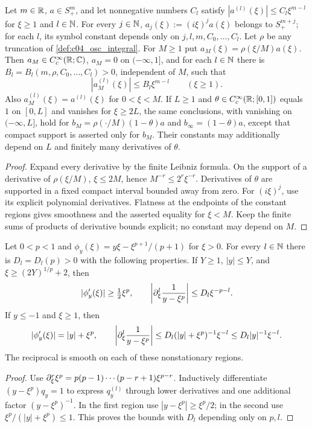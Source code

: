 \begin{lemma}
  \label{lem:c04_osc_cutoff_symbols}
  Let $m\in\mathbb{R}$, $a\in S^m_+$, and let nonnegative numbers $C_l$ satisfy
  $|a^{(l)}(\xi)|\le C_l\xi^{m-l}$ for $\xi\ge1$ and $l\in\mathbb{N}$.
  For every $j\in\mathbb{N}$, $a_j(\xi):=(i\xi)^ja(\xi)$ belongs to $S^{m+j}_+$;
  for each $l$, its symbol constant depends only on $j,l,m,C_0,\ldots,C_l$.
  Let $\rho$ be any truncation of \cref{def:c04_osc_integral}. For $M\ge1$ put
  $a_M(\xi)=\rho(\xi/M)a(\xi)$. Then $a_M\in C_c^\infty(\mathbb{R};\mathbb{C})$,
  $a_M=0$ on $(-\infty,1]$, and for each $l\in\mathbb{N}$ there is
  $B_l=B_l(m,\rho,C_0,\ldots,C_l)>0$, independent of $M$, such that
  \[
    |a_M^{(l)}(\xi)|\le B_l\xi^{m-l}\qquad(\xi\ge1).
  \]
  Also $a_M^{(l)}(\xi)=a^{(l)}(\xi)$ for $0<\xi<M$.
  If $L\ge1$ and $\theta\in C_c^\infty(\mathbb{R};[0,1])$ equals $1$ on $[0,L]$
  and vanishes for $\xi\ge2L$, the same conclusions, with vanishing on
  $(-\infty,L]$, hold for $b_M=\rho(\cdot/M)(1-\theta)a$ and
  $b_\infty=(1-\theta)a$, except that compact support is asserted only for $b_M$.
  Their constants may additionally depend on $L$ and finitely many derivatives of $\theta$.
\end{lemma}
\begin{proof}
  Expand every derivative by the finite Leibniz formula. On the support of a derivative
  of $\rho(\xi/M)$, $\xi\le2M$, hence $M^{-r}\le2^r\xi^{-r}$.
  Derivatives of $\theta$ are supported in a fixed compact interval bounded away from zero.
  For $(i\xi)^j$, use its explicit polynomial derivatives. Flatness at the endpoints of
  the constant regions gives smoothness and the asserted equality for $\xi<M$.
  Keep the finite sums of products of derivative bounds explicit; no constant may depend on $M$.
\end{proof}

\begin{lemma}
  \label{lem:c04_osc_phase_reciprocal}
  Let $0<p<1$ and $\phi_y(\xi)=y\xi-\xi^{p+1}/(p+1)$ for $\xi>0$.
  For every $l\in\mathbb{N}$ there is $D_l=D_l(p)>0$ with the following properties.
  If $Y\ge1$, $|y|\le Y$, and $\xi\ge(2Y)^{1/p}+2$, then
  \[
    |\phi_y'(\xi)|\ge\tfrac12\xi^p,\qquad
    \left|\partial_\xi^l\frac1{y-\xi^p}\right|\le D_l\xi^{-p-l}.
  \]
  If $y\le-1$ and $\xi\ge1$, then
  \[
    |\phi_y'(\xi)|=|y|+\xi^p,\qquad
    \left|\partial_\xi^l\frac1{y-\xi^p}\right|
       \le D_l(|y|+\xi^p)^{-1}\xi^{-l}
       \le D_l|y|^{-1}\xi^{-l}.
  \]
  The reciprocal is smooth on each of these nonstationary regions.
\end{lemma}
\begin{proof}
  Use $\partial_\xi^r\xi^p=p(p-1)\cdots(p-r+1)\xi^{p-r}$.
  Inductively differentiate $(y-\xi^p)q_y=1$ to express $q_y^{(l)}$ through lower
  derivatives and one additional factor $(y-\xi^p)^{-1}$. In the first region use
  $|y-\xi^p|\ge\xi^p/2$; in the second use
  $\xi^p/(|y|+\xi^p)\le1$. This proves the bounds with $D_l$ depending only on $p,l$.
\end{proof}


